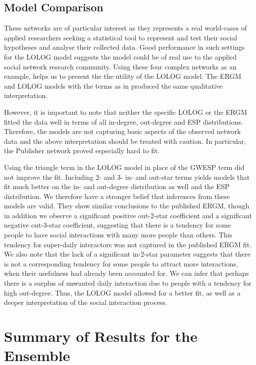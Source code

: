 \documentclass[
]{statsoc}
\begin{document}
\subsection{Model Comparison}

These networks are of particular interest as they represents a real
world-cases of applied researchers seeking a statistical tool to
represent and test their social hypotheses and analyse their collected
data. Good performance in such settings for the LOLOG model suggests the
model could be of real use to the applied social network research
community. Using these four complex networks as an example, helps us to
present the the utility of the LOLOG model. The ERGM and LOLOG models
with the terms as in \cite{Sailer2012} produced the same qualitative
interpretation.

However, it is important to note that neither the specific LOLOG or the
ERGM fitted the data well in terms of all in-degree, out-degree and ESP
distributions. Therefore, the models are not capturing basic aspects of
the observed network data and the above interpretation should be treated
with caution. In particular, the Publisher network proved especially
hard to fit.

Using the triangle term in the LOLOG model in place of the GWESP term
did not improve the fit. Including 2- and 3- in- and out-star terms
yields models that fit much better on the in- and out-degree
distribution as well and the ESP distribution. We therefore have a
stronger belief that inferences from these models are valid. They show
similar conclusions to the published ERGM, though in addition we observe
a significant positive out-2-star coefficient and a significant negative
out-3-star coefficient, suggesting that there is a tendency for some
people to have social interactions with many more people than others.
This tendency for super-daily interactors was not captured in the
published ERGM fit. We also note that the lack of a significant
in-2-star parameter suggests that there is not a corresponding tendency
for some people to attract more interactions, when their usefulness had
already been accounted for. We can infer that perhaps there is a surplus
of unwanted daily interaction due to people with a tendency for high
out-degree. Thus, the LOLOG model allowed for a better fit, as well as a
deeper interpretation of the social interaction process.

\section{Summary of Results for the Ensemble}\label{sec:results}
\end{document}

